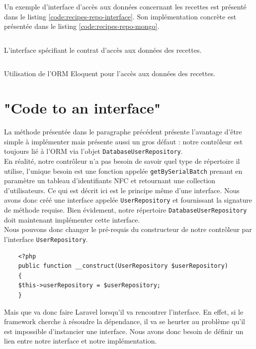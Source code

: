 		Un exemple d'interface d'accès aux données concernant les recettes est présenté dans le listing \ref{code:recipes-repo-interface}. Son implémentation concrète est présentée dans le listing \ref{code:recipes-repo-mongo}.

		\begin{listing}[H]
			\inputminted{php}{code/RecipesRepository.php}
			\caption{L'interface spécifiant le contrat d'accès aux données des recettes.}
			\label{code:recipes-repo-interface}
		\end{listing}

		\begin{code}
			\inputminted{php}{code/MongoRecipesRepository.php}
			\caption{Utilisation de l'ORM Eloquent pour l'accès aux données des recettes.}
			\label{code:recipes-repo-mongo}
		\end{code}

\section{"Code to an interface"}
	La méthode présentée dans le paragraphe précédent présente l'avantage d'être simple à implémenter mais présente aussi un gros défaut : notre contrôleur est toujours lié à l'ORM via l'objet \verb|DatabaseUserRepository|.\\

	En réalité, notre contrôleur n'a pas besoin de savoir quel type de répertoire il utilise, l'unique besoin est une fonction appelée \verb|getBySerialBatch| prenant en paramètre un tableau d'identifiants NFC et retournant une collection d'utilisateurs. Ce qui est décrit ici est le principe même d'une interface. Nous avons donc créé une interface appelée \verb|UserRepository| et fournissant la signature de méthode requise. Bien évidement, notre répertoire \verb|DatabaseUserRepository| doit maintenant implémenter cette interface.\\

	Nous pouvons donc changer le pré-requis du constructeur de notre contrôleur par l'interface \verb|UserRepository|.
	\begin{verbatim}
	<?php
	public function __construct(UserRepository $userRepository)
	{
	$this->userRepository = $userRepository;
	}
	\end{verbatim}

	Mais que va donc faire Laravel lorsqu'il va rencontrer l'interface. En effet, si le framework cherche à résoudre la dépendance, il va se heurter au problème qu'il est impossible d'instancier une interface. Nous avons donc besoin de définir un lien entre notre interface et notre implémentation.

